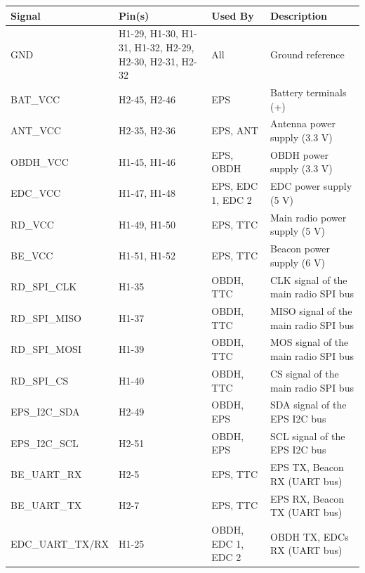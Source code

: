 \begin{table}[!h]
    \centering
    \begin{tabular}{lL{0.2\textwidth}L{0.15\textwidth}L{0.35\textwidth}}
        \toprule[1.5pt]
        \textbf{Signal}  & \textbf{Pin(s)} & \textbf{Used By}     & \textbf{Description} \\
        \midrule
        GND              & H1-29, H1-30, H1-31, H1-32, H2-29, H2-30, H2-31, H2-32 & All                  & Ground reference \\
        BAT\_VCC         & H2-45, H2-46    & EPS                  & Battery terminals (+) \\
        ANT\_VCC         & H2-35, H2-36    & EPS, ANT             & Antenna power supply (3.3 V) \\
        OBDH\_VCC        & H1-45, H1-46    & EPS, OBDH            & OBDH power supply (3.3 V) \\
        EDC\_VCC         & H1-47, H1-48    & EPS, EDC 1, EDC 2    & EDC power supply (5 V) \\
        RD\_VCC          & H1-49, H1-50    & EPS, TTC             & Main radio power supply (5 V) \\
        BE\_VCC          & H1-51, H1-52    & EPS, TTC             & Beacon power supply (6 V) \\
        RD\_SPI\_CLK     & H1-35           & OBDH, TTC            & CLK signal of the main radio SPI bus \\
        RD\_SPI\_MISO    & H1-37           & OBDH, TTC            & MISO signal of the main radio SPI bus \\
        RD\_SPI\_MOSI    & H1-39           & OBDH, TTC            & MOS signal of the main radio SPI bus \\
        RD\_SPI\_CS      & H1-40           & OBDH, TTC            & CS signal of the main radio SPI bus \\
        EPS\_I2C\_SDA    & H2-49           & OBDH, EPS            & SDA signal of the EPS I2C bus \\
        EPS\_I2C\_SCL    & H2-51           & OBDH, EPS            & SCL signal of the EPS I2C bus \\
        BE\_UART\_RX     & H2-5            & EPS, TTC             & EPS TX, Beacon RX (UART bus) \\
        BE\_UART\_TX     & H2-7            & EPS, TTC             & EPS RX, Beacon TX (UART bus) \\
        EDC\_UART\_TX/RX & H1-25           & OBDH, EDC 1, EDC 2   & OBDH TX, EDCs RX (UART bus) \\

\end{tabular}
\end{table}
